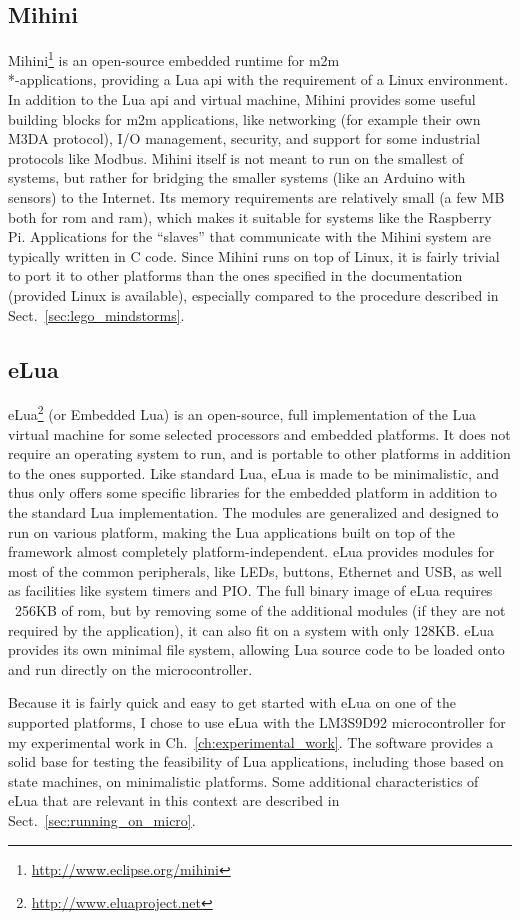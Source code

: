 \subsection{Mihini}
\label{sec:mihini}
Mihini\footnote{\url{http://www.eclipse.org/mihini}} is an open-source embedded runtime for \gls{m2m}\\*-applications, providing a Lua \gls{api} with the requirement of a Linux environment. In addition to the Lua \gls{api} and virtual machine, Mihini provides some useful building blocks for \gls{m2m} applications, like networking (for example their own M3DA protocol), I/O management, security, and support for some industrial protocols like Modbus. Mihini itself is not meant to run on the smallest of systems, but rather for bridging the smaller systems (like an Arduino with sensors) to the Internet. Its memory requirements are relatively small (a few MB both for \gls{rom} and \gls{ram}), which makes it suitable for systems like the Raspberry Pi. Applications for the ``slaves'' that communicate with the Mihini system are typically written in C code. Since Mihini runs on top of Linux, it is fairly trivial to port it to other platforms than the ones specified in the documentation (provided Linux is available), especially compared to the procedure described in Sect.~\ref{sec:lego_mindstorms}.

\subsection{eLua}
\label{sec:elua}
eLua\footnote{\url{http://www.eluaproject.net}} (or Embedded Lua) is an open-source, full implementation of the Lua virtual machine for some selected processors and embedded platforms. It does not require an operating system to run, and is portable to other platforms in addition to the ones supported. Like standard Lua, eLua is made to be minimalistic, and thus only offers some specific libraries for the embedded platform in addition to the standard Lua implementation. The modules are generalized and designed to run on various platform, making the Lua applications built on top of the framework almost completely platform-independent. eLua provides modules for most of the common peripherals, like LEDs, buttons, Ethernet and USB, as well as facilities like system timers and PIO. The full binary image of eLua requires ~256KB of \gls{rom}, but by removing some of the additional modules (if they are not required by the application), it can also fit on a system with only 128KB. eLua provides its own minimal file system, allowing Lua source code to be loaded onto and run directly on the microcontroller.

\noindent
Because it is fairly quick and easy to get started with eLua on one of the supported platforms, I chose to use eLua with the LM3S9D92 microcontroller for my experimental work in Ch.~\ref{ch:experimental_work}. The software provides a solid base for testing the feasibility of Lua applications, including those based on state machines, on minimalistic platforms. Some additional characteristics of eLua that are relevant in this context are described in Sect.~\ref{sec:running_on_micro}.